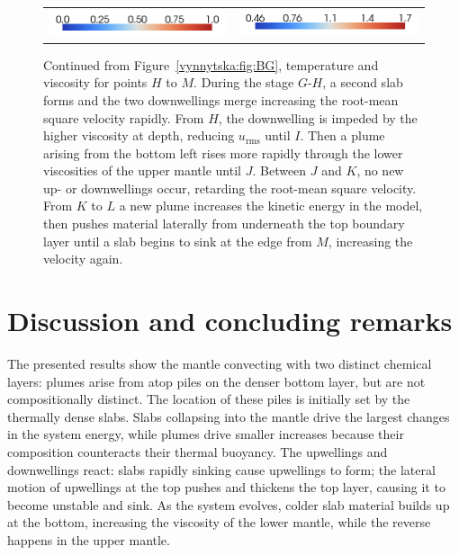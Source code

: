 \begin{figure}
\begin{center}
\begin{tabular}{c r}
\includegraphics[width=0.45\columnwidth]{chapters/vynnytska/png/tmleg.png} &
\includegraphics[width=0.45\columnwidth]{chapters/vynnytska/png/visleg.png}
\end{tabular}
\end{center}
\caption{Continued from Figure~\ref{vynnytska:fig:BG}, temperature and
  viscosity for points $H$ to $M$. During the stage $G$-$H$, a second
  slab forms and the two downwellings merge increasing the root-mean
  square velocity rapidly. From $H$, the downwelling is impeded by the
  higher viscosity at depth, reducing $u_{\mathrm{rms}}$ until $I$. Then a
  plume arising from the bottom left rises more rapidly through the
  lower viscosities of the upper mantle until $J$. Between $J$ and
  $K$, no new up- or downwellings occur, retarding the root-mean
  square velocity. From $K$ to $L$ a new plume increases the kinetic
  energy in the model, then pushes material laterally from underneath
  the top boundary layer until a slab begins to sink at the edge from
  $M$, increasing the velocity again.}
\label{vynnytska:fig:HM}
\end{figure}


\section{Discussion and concluding remarks}

The presented results show the mantle convecting with two distinct
chemical layers: plumes arise from atop piles on the denser bottom layer,
but are not compositionally distinct. The location of these piles is
initially set by the thermally dense slabs. Slabs collapsing into the
mantle drive the largest changes in the system energy, while plumes
drive smaller increases because their composition counteracts their
thermal buoyancy. The upwellings and downwellings react: slabs rapidly
sinking cause upwellings to form; the lateral motion of upwellings at
the top pushes and thickens the top layer, causing it to become unstable
and sink. As the system evolves, colder slab material builds up at the
bottom, increasing the viscosity of the lower mantle, while the reverse
happens in the upper mantle.

